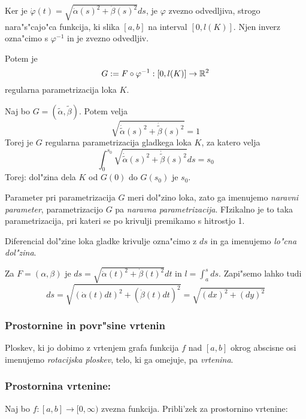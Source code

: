 Ker je $\dot{\varphi}(t) = \sqrt{\dot{\alpha}(s)^2 + \dot{\beta}(s)^2} ds$, je $\varphi$ zvezno odvedljiva, strogo nara"s"cajo"ca funkcija, ki slika $[a, b]$ na interval $[0, l(K)]$. Njen inverz ozna"cimo s $\varphi^{-1}$ in je zvezno odvedljiv.

Potem je
\begin{equation*}
G := F \circ \varphi^{-1}: [0, l(K)] \to \mathbb{R}^2
\end{equation*}
regularna parametrizacija loka $K$.

Naj bo $G = (\tilde{\alpha}, \tilde{\beta})$. Potem velja
\begin{equation*}
\sqrt{\dot{\tilde{\alpha}}(s)^2 + \dot{\tilde{\beta}}(s)^2} = 1
\end{equation*}
Torej je $G$ regularna parametrizacija gladkega loka $K$, za katero velja
\begin{equation*}
\int_0^{s_0}  \sqrt{\dot{\tilde{\alpha}}(s)^2 + \dot{\tilde{\beta}}(s)^2}  ds = s_0
\end{equation*}
Torej: dol"zina dela $K$ od $G(0)$ do $G(s_0)$ je $s_0$.

Parameter pri parametrizacija $G$ meri dol"zino loka, zato ga imenujemo \emph{naravni parameter}, parametrizacijo $G$ pa \emph{naravna parametrizacija}. FIzikalno je to taka parametrizacija, pri kateri se po krivulji premikamo s hitrostjo 1.

 Diferencial dol"zine loka gladke krivulje ozna"cimo z $ds$ in ga imenujemo \emph{lo"cna dol"zina}.

Za $F = (\alpha, \beta)$ je $ds = \sqrt{\dot{\alpha}(t)^2 + \dot{\beta}(t)^2} dt$ in $l = \int_a^s ds$. Zapi"semo lahko tudi
\begin{equation*}
ds = \sqrt{(\dot{\alpha}(t) dt)^2 + (\dot{\beta}(t)dt)^2} = \sqrt{(dx)^2 + (dy)^2}
\end{equation*}

\subsubsection{Prostornine in povr"sine vrtenin}
 Ploskev, ki jo dobimo z vrtenjem grafa funkcija $f$ nad $[a, b]$ okrog abscisne osi imenujemo \emph{rotacijska ploskev}, telo, ki ga omejuje, pa \emph{vrtenina}.

\subsubsection*{Prostornina vrtenine:}
Naj bo $f: [a, b] \to [0, \infty)$ zvezna funkcija. Pribli'zek za prostornino vrtenine:


